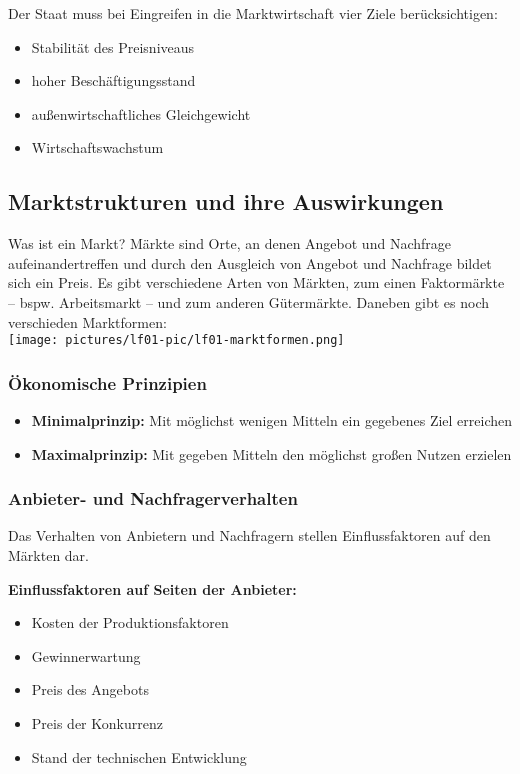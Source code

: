 Der Staat muss bei Eingreifen in die Marktwirtschaft vier Ziele berücksichtigen:
	
\begin{itemize}
	\item Stabilität des Preisniveaus
	\item hoher Beschäftigungsstand 
	\item außenwirtschaftliches Gleichgewicht
	\item Wirtschaftswachstum
\end{itemize}


\subsection{Marktstrukturen und ihre Auswirkungen}

Was ist ein Markt? Märkte sind Orte, an denen Angebot und Nachfrage aufeinandertreffen und durch den Ausgleich von Angebot und Nachfrage bildet sich ein Preis. Es gibt verschiedene Arten von Märkten, zum einen Faktormärkte -- bspw. Arbeitsmarkt -- und zum anderen Gütermärkte. Daneben gibt es noch verschieden Marktformen:\\
\texttt{[image: pictures/lf01-pic/lf01-marktformen.png]}

\subsubsection{Ökonomische Prinzipien}
\begin{itemize}
	\item \textbf{Minimalprinzip:} Mit möglichst wenigen Mitteln ein gegebenes Ziel erreichen
	\item \textbf{Maximalprinzip:} Mit gegeben Mitteln den möglichst großen Nutzen erzielen
\end{itemize}

\subsubsection{Anbieter- und Nachfragerverhalten}
Das Verhalten von Anbietern und Nachfragern stellen Einflussfaktoren auf den Märkten dar.

{\bf Einflussfaktoren auf Seiten der Anbieter:}
\begin{itemize}
	\item Kosten der Produktionsfaktoren
	\item Gewinnerwartung
	\item Preis des Angebots
	\item Preis der Konkurrenz
	\item Stand der technischen Entwicklung
\end{itemize}

